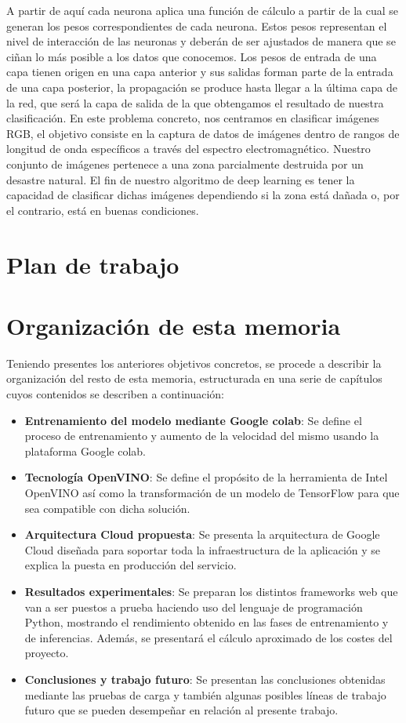 A partir de aquí cada neurona aplica una función de cálculo a partir de la cual se generan los pesos correspondientes de cada neurona.
Estos pesos representan el nivel de interacción de las neuronas y deberán de ser ajustados de manera que se ciñan lo más posible a los datos que conocemos.
Los pesos de entrada de una capa tienen origen en una capa anterior y sus salidas forman parte de la entrada de una capa posterior, la propagación se produce hasta llegar a la última capa de la red, que será la capa
de salida de la que obtengamos el resultado de nuestra clasificación.
En este problema concreto, nos centramos en clasificar imágenes RGB,
el objetivo consiste en la captura de datos de imágenes dentro de rangos de longitud de onda específicos a través del espectro electromagnético.
Nuestro conjunto de imágenes pertenece a una zona parcialmente destruida por un desastre natural.
El fin de nuestro algoritmo de deep learning es tener la capacidad de clasificar dichas imágenes dependiendo si la zona está dañada o,
por el contrario, está en buenas condiciones.

\section{Plan de trabajo}\label{sec:plan-de-trabajo}

\section{Organización de esta memoria}\label{sec:organización-de-esta-memoria}

Teniendo presentes los anteriores objetivos concretos, se procede a describir la organización del resto de esta memoria, estructurada en una serie de capítulos cuyos contenidos se
describen a continuación:

\begin{itemize}
    \item \textbf{Entrenamiento del modelo mediante Google colab}: Se define el proceso de entrenamiento y aumento de la velocidad del mismo usando la plataforma Google colab.
    \item \textbf{Tecnología OpenVINO}: Se define el propósito de la herramienta de Intel OpenVINO así como la transformación de un modelo de TensorFlow para que sea compatible con dicha solución.
    \item \textbf{Arquitectura Cloud propuesta}: Se presenta la arquitectura de Google Cloud diseñada para soportar toda la infraestructura de la aplicación y se explica la puesta en producción del servicio.
    \item \textbf{Resultados experimentales}: Se preparan los distintos frameworks web que van a ser puestos a prueba haciendo uso del lenguaje de programación Python, mostrando el rendimiento obtenido en las fases de entrenamiento y de inferencias. Además, se presentará el cálculo aproximado de los costes del proyecto.
    \item \textbf{Conclusiones y trabajo futuro}: Se presentan las conclusiones obtenidas mediante las pruebas de carga y también algunas posibles líneas de trabajo futuro que se pueden desempeñar en relación al presente trabajo.
\end{itemize}